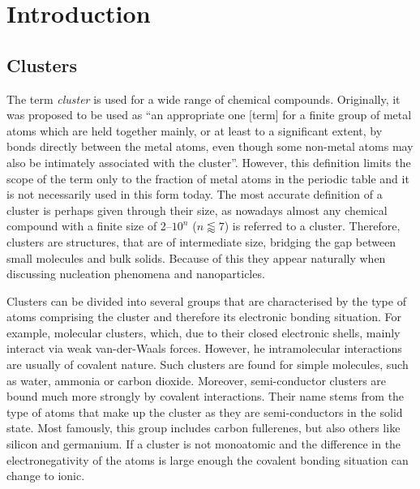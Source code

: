 
\part{Introduction}
\label{sec:introduction}

%
\chapter{Clusters}
\label{sec:clusters}

The term \emph{cluster} is used for a wide range of chemical compounds.
Originally, it was proposed to be used as ``an appropriate one [term] for a
finite group of metal atoms which are held together mainly, or at least to a
significant extent, by bonds directly between the metal atoms, even though some
non-metal atoms may also be intimately associated with the
cluster''.\autocite{Cotton_MetalAtomClusters_1964} However, this definition
limits the scope of the term only to the fraction of metal atoms in the periodic
table and it is not necessarily used in this form today. The most accurate
definition of a cluster is perhaps given through their size, as nowadays almost
any chemical compound with a finite size of 2--$10^n$ ($n\lessapprox 7$) is
referred to a
cluster.\autocite{Johnston_Atomicmolecularclusters_2002,Wales_Energylandscapes_2003}
Therefore, clusters are structures, that are of intermediate size, bridging the
gap between small molecules and bulk solids. Because of this they appear
naturally when discussing nucleation phenomena and nanoparticles.

Clusters can be divided into several groups that are characterised by the type
of atoms comprising the cluster and therefore its electronic bonding situation.
For example, molecular clusters, which, due to their closed electronic shells,
mainly interact via weak van-der-Waals forces. However, he intramolecular
interactions are usually of covalent nature. Such clusters are found for simple
molecules, such as water,\autocite{Liu_WaterClusters_1996}
ammonia\autocite{Beu_Structureammoniaclusters_2001} or carbon
dioxide.\autocite{Takeuchi_GeometryOptimizationCarbon_2008} Moreover,
semi-conductor clusters are bound much more strongly by covalent interactions.
Their name stems from the type of atoms that make up the cluster as they are
semi-conductors in the solid state. Most famously, this group includes carbon
fullerenes\autocite{Kroto_stabilityfullerenesCn_1987}, but also others like
silicon\autocite{Zhu_Structuresstabilitiessmall_2003a} and
germanium.\autocite{Pacchioni_Silicongermaniumclusters_1986} If a cluster is not
monoatomic and the difference in the electronegativity of the atoms is large
enough the covalent bonding situation can change to ionic.

